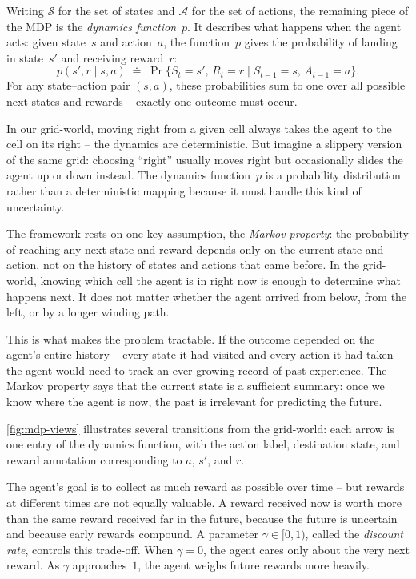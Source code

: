 \smallskip
Writing $\mathcal{S}$ for the set of states and $\mathcal{A}$ for
the set of actions, the remaining piece of the MDP is the
\emph{dynamics function}~$p$. It describes what happens when the
agent acts: given state~$s$ and action~$a$, the function~$p$ gives
the probability of landing in state~$s'$ and receiving reward~$r$:
%
\begin{equation}
\label{eq:mdp-dynamics}
p(s', r \mid s, a)
  \;\doteq\;
  \Pr\{S_t = s',\, R_t = r \mid S_{t-1} = s,\, A_{t-1} = a\}.
\end{equation}
%
For any state--action pair $(s, a)$, these probabilities sum to one
over all possible next states and rewards -- exactly one outcome
must occur.

\smallskip
In our grid-world, moving right from a given cell always takes
the agent to the cell on its right -- the dynamics are
deterministic. But imagine a slippery version of the same grid:
choosing ``right'' usually moves right but occasionally slides
the agent up or down instead. The dynamics function~$p$ is a
probability distribution rather than a deterministic mapping
because it must handle this kind of uncertainty.

\smallskip
The framework rests on one key assumption, the \emph{Markov
property}: the probability of reaching any next state and reward
depends only on the current state and action, not on the history of
states and actions that came before. In the grid-world, knowing
which cell the agent is in right now is enough to determine what
happens next. It does not matter whether the agent arrived from
below, from the left, or by a longer winding path.

\smallskip
This is what makes the problem tractable. If the outcome depended
on the agent's entire history -- every state it had visited and
every action it had taken -- the agent would need to track an
ever-growing record of past experience. The Markov property says
that the current state is a sufficient summary: once we know where
the agent is now, the past is irrelevant for predicting the future.

\smallskip
\cref{fig:mdp-views} illustrates several transitions from the
grid-world: each arrow is one entry of the dynamics function, with
the action label, destination state, and reward annotation
corresponding to $a$, $s'$, and $r$.



\smallskip
The agent's goal is to collect as much reward as possible over
time -- but rewards at different times are not equally valuable.
A reward received now is worth more than the same reward received
far in the future, because the future is uncertain and because
early rewards compound. A parameter $\gamma \in [0, 1)$, called
the \emph{discount rate}, controls this trade-off. When
$\gamma = 0$, the agent cares only about the very next reward.
As $\gamma$ approaches~$1$, the agent weighs future rewards more
heavily.

